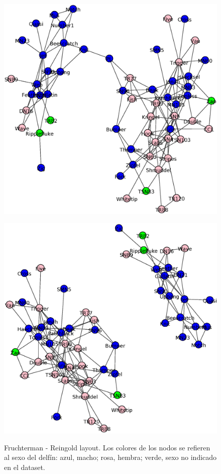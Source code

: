\begin{figure}
\begin{subfloat}[]
{}
\end{subfloat}
\begin{subfloat}[]
{
	\includegraphics[scale = 0.27]{figuras/Parte_c2} 
}
\end{subfloat}
\begin{subfloat}[]
{
	\includegraphics[scale = 0.27]{figuras/Parte_c3} 
}
\end{subfloat}
\label{fig:Betweennes}
\caption{Fruchterman - Reingold layout. Los colores de los nodos se refieren al sexo del delfín: azul, macho; rosa, hembra; verde, sexo no indicado en el dataset.}
\end{figure}
